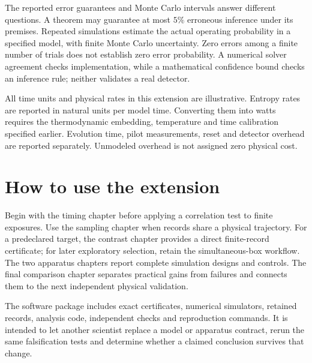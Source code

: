 The reported error guarantees and Monte Carlo intervals answer different
questions. A theorem may guarantee at most $5\%$ erroneous inference under its
premises. Repeated simulations estimate the actual operating probability in a
specified model, with finite Monte Carlo uncertainty. Zero errors among a
finite number of trials does not establish zero error probability. A numerical
solver agreement checks implementation, while a mathematical confidence bound
checks an inference rule; neither validates a real detector.

All time units and physical rates in this extension are illustrative. Entropy
rates are reported in natural units per model time. Converting them into watts
requires the thermodynamic embedding, temperature and time calibration specified
earlier. Evolution time, pilot measurements, reset and detector overhead are
reported separately. Unmodeled overhead is not assigned zero physical cost.

\section{How to use the extension}
Begin with the timing chapter before applying a correlation test to finite
exposures. Use the sampling chapter when records share a physical trajectory.
For a predeclared target, the contrast chapter provides a direct finite-record
certificate; for later exploratory selection, retain the simultaneous-box
workflow. The two apparatus chapters report complete simulation designs and
controls. The final comparison chapter separates practical gains from failures
and connects them to the next independent physical validation.

The software package includes exact certificates, numerical simulators,
retained records, analysis code, independent checks and reproduction commands.
It is intended to let another scientist replace a model or apparatus contract,
rerun the same falsification tests and determine whether a claimed conclusion
survives that change.

